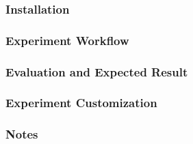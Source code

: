 \subsubsection{Installation}

\subsubsection{Experiment Workflow}

\subsubsection{Evaluation and Expected Result}

\subsubsection{Experiment Customization}

\subsubsection{Notes}

